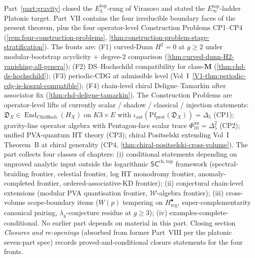 \documentclass[11pt]{memoir}
\providecommand{\cref}[1]{\ref{#1}}
\providecommand{\cW}{\mathcal{W}}
\newcommand{\SCchtop}{{\mathsf{SC}^{\mathrm{ch,top}}}}
\providecommand{\protectedPfaff}[1]{\mathrm{Pf}_{\mathrm{prot}}(#1)}
\providecommand{\Deltafive}{\Delta_{5}}
\providecommand{\Phitenun}{\Phi_{10}^{\mathrm{un}}}
\begin{document}
\noindent
Part~\ref{part:gravity} closed the $E_3^{\mathrm{top}}$-rung of
Virasoro and stated the $E_\infty^{\mathrm{top}}$-ladder
Platonic target. Part~VII contains the four irreducible boundary
faces of the present theorem, plus the four operator-level
Construction Problems CP1--CP4
\textup{(}\cref{rem:four-construction-problems},
\cref{thm:construction-problem-stage-stratification}\textup{)}.
The fronts are: \textup{(F1)} curved-Dunn $H^2 = 0$ at $g \ge 2$
under modular-bootstrap acyclicity + degree-$2$ comparison
\textup{(}\cref{thm:curved-dunn-H2-vanishing-all-genera}\textup{)};
\textup{(F2)} DS--Hochschild compatibility for class-$\mathbf{M}$
\textup{(}\cref{thm:chd-ds-hochschild}\textup{)}; \textup{(F3)}
periodic-CDG at admissible level
\textup{(}Vol~I~\cref{V1-thm:periodic-cdg-is-koszul-compatible}\textup{)};
\textup{(F4)} chain-level chiral Deligne--Tamarkin after
associator fix \textup{(}\cref{thm:chd-deligne-tamarkin}\textup{)}.
The Construction Problems are operator-level lifts of currently
scalar / shadow / classical / injection statements:
$\mathfrak D_X\in\operatorname{End}_{\mathrm{ChirHoch}}(H_X)$ on
$K3 \times E$ with
$\iota_{\mathrm{aut}}(\protectedPfaff{\mathfrak D_X})=\Deltafive$
\textup{(CP1)};
gravity-line operator algebra with Pentagon-face scalar trace
$\Phitenun = \Deltafive^2$ \textup{(CP2)}; unified PVA-quantum HT
theory \textup{(CP3)}; chiral Positselski extending Vol~I
Theorem~B at chiral generality \textup{(CP4,
\cref{thm:chiral-positselski-cross-volume}\textup{)}}. The part
collects four classes of chapters: \textup{(i)} conditional
statements depending on unproved analytic input outside the
logarithmic $\SCchtop$ framework
\textup{(}spectral-braiding frontier, celestial frontier, log HT
monodromy frontier, anomaly-completed frontier,
ordered-associative-KD frontier\textup{)}; \textup{(ii)}
conjectural chain-level extensions
\textup{(}modular PVA quantisation frontier, $\cW$-algebra
frontier\textup{)}; \textup{(iii)} cross-volume scope-boundary
items \textup{(}$W(p)$ tempering on $H^\bullet_{\mathrm{reg}}$,
super-complementarity canonical pairing, $\lambda_g$-conjecture
residue at $g \ge 3$\textup{)}; \textup{(iv)}
examples-complete-conditional. No earlier part depends on
material in this part. Closing section
\emph{Closures and re-openings}
\textup{(}absorbed from former Part~VIII per the platonic
seven-part spec\textup{)} records proved-and-conditional closure
statements for the four fronts.








%



\end{document}
